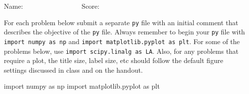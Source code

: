 \documentclass[10pt]{article}
\begin{document}
\vspace{2cm}
\flushright Name: $\qquad \qquad \qquad \qquad $
\flushright Score: $\qquad \qquad \qquad \qquad $

\pagebreak







\flushleft
For each problem below submit a separate \texttt{py} file with an initial comment that describes the objective of the \texttt{py} file.  Always remember to begin your \texttt{py} file with \texttt{import numpy as np} and \verb|import matplotlib.pyplot as plt|.  For some of the problems below, use \texttt{import scipy.linalg as LA}.   Also, for any problems that require a plot, the title size, label size, etc should follow the default figure settings discussed in class and on the handout.  


import numpy as np
import matplotlib.pyplot as plt
\end{document}
